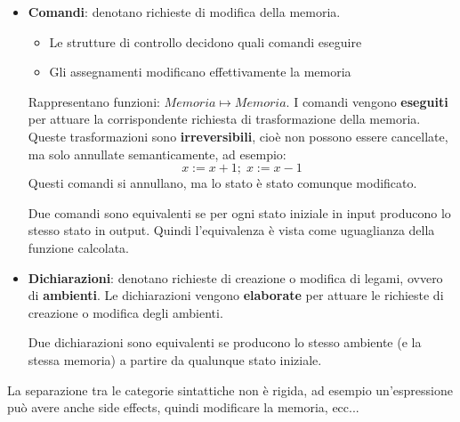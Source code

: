 \documentclass[a4paper]{article}
\begin{document}
\begin{itemize}
  \item \textbf{Comandi}: denotano richieste di modifica della memoria.
    \begin{itemize}
      \item Le strutture di controllo decidono quali comandi eseguire
      \item Gli assegnamenti modificano effettivamente la memoria
    \end{itemize}
    Rappresentano funzioni: \( Memoria \mapsto Memoria \). I comandi vengono
    \textbf{eseguiti} per attuare la corrispondente richiesta di trasformazione della
    memoria. Queste trasformazioni sono \textbf{irreversibili}, cioè non possono essere
    cancellate, ma solo annullate semanticamente, ad esempio:
    \[
      x := x + 1; \; x := x - 1
    \] 
    Questi comandi si annullano, ma lo stato è stato comunque modificato.

    \begin{definition}
      Due comandi sono equivalenti se per ogni stato iniziale in input producono lo
      stesso stato in output. Quindi l'equivalenza è vista come uguaglianza della
      funzione calcolata.
    \end{definition}

  \item \textbf{Dichiarazioni}: denotano richieste di creazione o modifica di legami,
    ovvero di \textbf{ambienti}. Le dichiarazioni vengono \textbf{elaborate} per
    attuare le richieste di creazione o modifica degli ambienti.

    \begin{definition}
      Due dichiarazioni sono equivalenti se producono lo stesso ambiente (e la stessa
      memoria) a partire da qualunque stato iniziale.
    \end{definition}
\end{itemize}
La separazione tra le categorie sintattiche non è rigida, ad esempio un'espressione
può avere anche side effects, quindi modificare la memoria, ecc...
\end{document}
